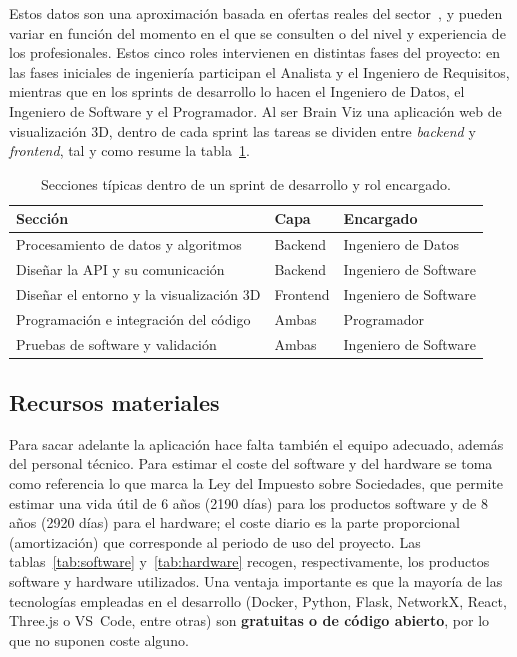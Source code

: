Estos datos son una aproximación basada en ofertas reales del sector~\cite{salarios}, y pueden variar
en función del momento en el que se consulten o del nivel y experiencia de los profesionales. Estos
cinco roles intervienen en distintas fases del proyecto: en las fases iniciales de ingeniería
participan el Analista y el Ingeniero de Requisitos, mientras que en los sprints de desarrollo lo
hacen el Ingeniero de Datos, el Ingeniero de Software y el Programador. Al ser Brain Viz una
aplicación web de visualización 3D, dentro de cada sprint las tareas se dividen entre \textit{backend}
y \textit{frontend}, tal y como resume la tabla~\ref{tab:secciones}.

\begin{table}[H]
	\centering
	\caption{Secciones típicas dentro de un sprint de desarrollo y rol encargado.}
	\label{tab:secciones}
	\begin{tabularx}{\textwidth}{X >{\centering\arraybackslash}p{1.8cm} l}
		\toprule
		\textbf{Sección} & \textbf{Capa} & \textbf{Encargado} \\
		\midrule
		Procesamiento de datos y algoritmos        & Backend  & Ingeniero de Datos \\
		Diseñar la API y su comunicación           & Backend  & Ingeniero de Software \\
		Diseñar el entorno y la visualización 3D   & Frontend & Ingeniero de Software \\
		Programación e integración del código      & Ambas    & Programador \\
		Pruebas de software y validación           & Ambas    & Ingeniero de Software \\
		\bottomrule
	\end{tabularx}
\end{table}

\subsection{Recursos materiales}

Para sacar adelante la aplicación hace falta también el equipo adecuado,
además del personal técnico. Para estimar el coste del software y del hardware se toma como
referencia lo que marca la Ley del Impuesto sobre Sociedades, que permite estimar una vida útil de 6
años (2190 días) para los productos software y de 8 años (2920 días) para el hardware; el coste
diario es la parte proporcional (amortización) que corresponde al periodo de uso del proyecto. Las
tablas~\ref{tab:software} y~\ref{tab:hardware} recogen, respectivamente, los productos software y
hardware utilizados. Una ventaja importante es que la mayoría de las tecnologías empleadas en el
desarrollo (Docker, Python, Flask, NetworkX, React, Three.js o VS~Code, entre otras) son
\textbf{gratuitas o de código abierto}, por lo que no suponen coste alguno.

